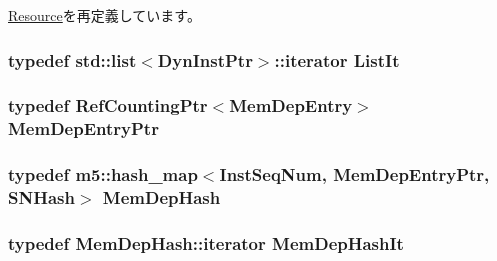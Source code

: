 \hyperlink{classResource_af9d0c8a46736ba6aa2d8bb94da1a5e73}{Resource}を再定義しています。\hypertarget{classMemDepUnit_a184cb829e22cc656acb41864f68f51ea}{
\subsubsection[{ListIt}]{\setlength{\rightskip}{0pt plus 5cm}typedef {\bf std::list}$<${\bf DynInstPtr}$>$::iterator {\bf ListIt}}}
\label{classMemDepUnit_a184cb829e22cc656acb41864f68f51ea}
\hypertarget{classMemDepUnit_a3ebb51dea989551d10194eb1b09cff41}{
\subsubsection[{MemDepEntryPtr}]{\setlength{\rightskip}{0pt plus 5cm}typedef {\bf RefCountingPtr}$<${\bf MemDepEntry}$>$ {\bf MemDepEntryPtr}}}
\label{classMemDepUnit_a3ebb51dea989551d10194eb1b09cff41}
\hypertarget{classMemDepUnit_a0552beec197948e07bf69cb6ea45407e}{
\subsubsection[{MemDepHash}]{\setlength{\rightskip}{0pt plus 5cm}typedef m5::hash\_\-map$<${\bf InstSeqNum}, {\bf MemDepEntryPtr}, {\bf SNHash}$>$ {\bf MemDepHash}}}
\label{classMemDepUnit_a0552beec197948e07bf69cb6ea45407e}
\hypertarget{classMemDepUnit_a4579af5e07d66f86f6e8aa193e0f926a}{
\subsubsection[{MemDepHashIt}]{\setlength{\rightskip}{0pt plus 5cm}typedef MemDepHash::iterator {\bf MemDepHashIt}}}
\label{classMemDepUnit_a4579af5e07d66f86f6e8aa193e0f926a}


